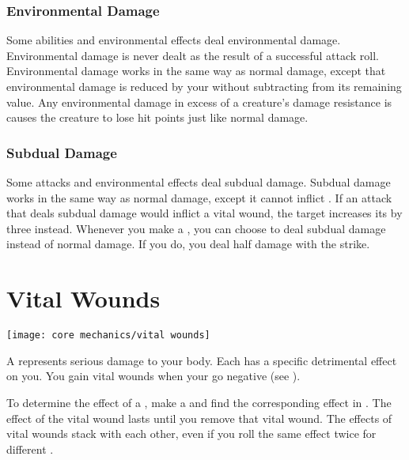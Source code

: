         \subsubsection{Environmental Damage}\label{Environmental Damage}
            Some abilities and environmental effects deal environmental damage.
            Environmental damage is never dealt as the result of a successful attack roll.
            Environmental damage works in the same way as normal damage, except that environmental damage is reduced by your  without subtracting from its remaining value.
            Any environmental damage in excess of a creature's damage resistance is causes the creature to lose hit points just like normal damage.

        \subsubsection{Subdual Damage}\label{Subdual Damage}
            Some attacks and environmental effects deal subdual damage.
            Subdual damage works in the same way as normal damage, except it cannot inflict .
            If an attack that deals subdual damage would inflict a vital wound, the target increases its  by three instead.
            Whenever you make a , you can choose to deal subdual damage instead of normal damage.
            If you do, you deal half damage with the strike.

\section{Vital Wounds}\label{Vital Wounds}
    \texttt{[image: core mechanics/vital wounds]}

    A  represents serious damage to your body.
    Each  has a specific detrimental effect on you.
    You gain vital wounds when your  go negative (see ).

    To determine the effect of a , make a  and find the corresponding effect in .
    The effect of the vital wound lasts until you remove that vital wound.
    The effects of vital wounds stack with each other, even if you roll the same effect twice for different .

